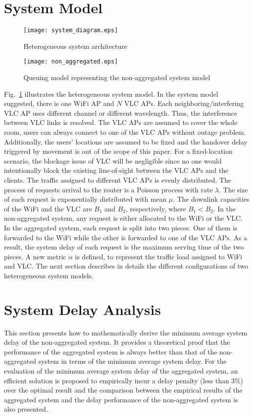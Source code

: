 \documentclass[10pt,journal]{IEEEtran}
\begin{document}
\section{System Model}\label{sec2}
\begin{figure}
\centering
\texttt{[image: system\_diagram.eps]}
\caption{Heterogeneous system architecture}
\label{fig_system_diagram}
\end{figure}

\begin{figure}
\centering
 \texttt{[image: non\_aggregated.eps]}
\caption{Queuing model representing the non-aggregated system model}
\label{fig_non_aggregated}
\end{figure}
Fig.~\ref{fig_system_diagram} illustrates the heterogeneous system model. In the system model suggested, there is one WiFi AP and $N$ VLC APs. Each neighboring/interfering VLC AP uses different channel or different wavelength. Thus, the interference between VLC links is resolved. The VLC APs are assumed to cover the whole room, users can always connect to one of the VLC APs without outage problem. Additionally, the users' locations are assumed to be fixed and the handover delay triggered by movement is out of the scope of this paper. For a fixed-location scenario, the blockage issue of VLC will be negligible since no one would intentionally block the existing line-of-sight between the VLC APs and the clients. The traffic assigned to different VLC APs is evenly distributed. The process of requests arrival to the router is a Poisson process with rate $\lambda$. The size of each request is exponentially distributed with mean $\mu$. The downlink capacities of the WiFi and the VLC are $B_{1}$ and $B_{2}$, respectively, where $B_{1}<B_{2}$. In the non-aggregated system, any request is either allocated to the WiFi or the VLC. In the aggregated system, each request is split into two pieces. One of them is forwarded to the WiFi while the other is forwarded to one of the VLC APs. As a result, the system delay of each request is the maximum serving time of the two pieces. A new metric $\alpha$ is defined, to represent the traffic load assigned to WiFi and VLC. The next section describes in details the different configurations of two heterogeneous system models.



\section{System Delay Analysis}\label{sec3}
This section presents how to mathematically derive the minimum average system delay of the non-aggregated system. It provides a theoretical proof that the performance of the aggregated system is always better than that of the non-aggregated system in terms of the minimum average system delay. For the evaluation of the minimum average system delay of the aggregated system, an efficient solution is proposed to empirically incur a delay penalty (less than 3\%) over the optimal result and the comparison between the empirical results of the aggregated system and the delay performance of the non-aggregated system is also presented.
\end{document}
